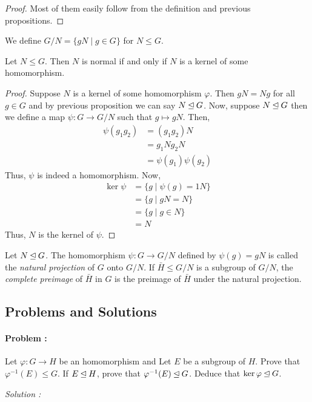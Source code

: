 \begin{proof}
    Most of them easily follow from the definition and previous propositions.
\end{proof}

\begin{definition}
    We define $G/N=\{gN \mid g \in G\}$ for $N \le G$.
\end{definition}

\begin{proposition}
    Let $N \le G$. Then $N$ is normal if and only if $N$ is a kernel of some homomorphism.
\end{proposition}

\begin{proof}
    Suppose $N$ is a kernel of some homomorphism $\varphi$. Then $gN = Ng$ for all $g \in G$ and by previous proposition we can say 
    $N \unlhd G$. Now, suppose $N \unlhd G$ then we define a map $\psi : G \to G/N$ such that $g \mapsto gN$.
    Then,
    \begin{align*}
        \psi(g_1 g_2) &= (g_1 g_2)N \\
        &= g_1 N g_2 N \\
        &= \psi(g_1) \psi(g_2)
    \end{align*}
    Thus, $\psi$ is indeed a homomorphism. Now,
    \begin{align*}
        \ker \psi &= \{ g \mid \psi(g) = 1 N\} \\
        &= \{ g \mid gN = N \} \\
        &= \{ g \mid g \in N\} \\
        &= N
    \end{align*}
    Thus, $N$ is the kernel of $\psi$.
\end{proof}

\begin{definition}
    Let $N \unlhd G$. The homomorphism $\psi : G \to G/N$ defined by $\psi(g)=gN$ is called the \textit{natural projection} of $G$ onto
    $G/N$. If $\bar{H} \le G/N$ is a subgroup of $G/N$, the \textit{complete preimage} of $\bar{H}$ in $G$ is the preimage of $\bar{H}$
    under the natural projection.
\end{definition}

\eject

\subsection*{Problems and Solutions}

\paragraph{Problem :} Let $\varphi : G \to H$ be an homomorphism and Let $E$ be a subgroup of $H$. Prove that $\varphi^{-1}(E) \le G$.
If $E \unlhd H$, prove that $\varphi^{-1}(E) \unlhd G$. Deduce that $\ker \varphi \unlhd G$.

\vspace{4mm}
\textit{Solution :}